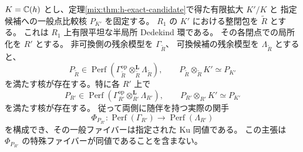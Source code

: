 \begin{theorem}
\label{mix:thm:h-integral-kernel}
$K=\mathbb C(h)$ とし、定理\ref{mix:thm:h-exact-candidate}で得た有限拡大 $K'/K$ と
指定候補への一般点比較核 $P_{K'}$ を固定する。
$R_1$ の $K'$ における整閉包を $\widetilde R$ とする。
これは $R_1$ 上有限平坦な半局所 Dedekind 環である。
その各閉点での局所化を $R'$ とする。
非可換側の残余模型を $\Gamma_{\widetilde R}$、
可換候補の残余模型を $\Lambda_{\widetilde R}$ とすると、
\[
 P_{\widetilde R}\in\operatorname{Perf}
  (\Gamma_{\widetilde R}^{\mathrm{op}}
       \otimes_{\widetilde R}^{\mathbf L}\Lambda_{\widetilde R}),
 \qquad P_{\widetilde R}\otimes_{\widetilde R}K'\simeq P_{K'}
\]
を満たす核が存在する。特に各 $R'$ 上で
\begin{equation}\label{mix:eq:h-integral-kernel}
 P_{R'}\in\operatorname{Perf}
       (\Gamma_{R'}^{\mathrm{op}}\otimes_{R'}^{\mathbf L}\Lambda_{R'}),
 \qquad
 P_{R'}\otimes_{R'}K'\simeq P_{K'}
\end{equation}
を満たす核が存在する。
従って両側に随伴を持つ実際の関手
\[
 \Phi_{P_{R'}}:\operatorname{Perf}(\Gamma_{R'})
       \longrightarrow\operatorname{Perf}(\Lambda_{R'})
\]
を構成でき、その一般ファイバーは指定された Ku 同値である。
この主張は $\Phi_{P_{R'}}$ の特殊ファイバーが同値であることを含まない。
\end{theorem}

